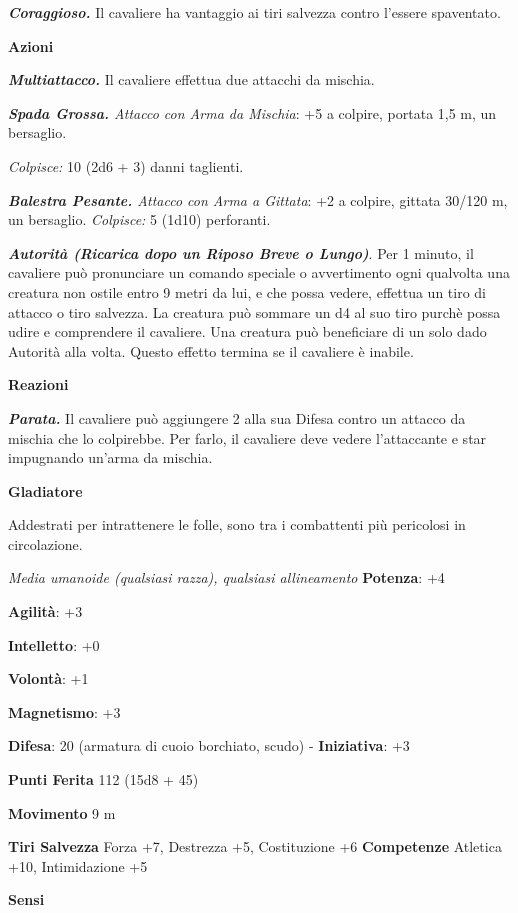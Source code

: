 \begin{multicols}{2}
\emph{\textbf{Coraggioso.}} Il cavaliere ha vantaggio ai tiri salvezza
contro l'essere spaventato.

\textbf{Azioni}

\emph{\textbf{Multiattacco.}} Il cavaliere effettua due attacchi da
mischia.

\emph{\textbf{Spada Grossa.} Attacco con Arma da Mischia}: +5 a colpire,
portata 1,5 m, un bersaglio.

\emph{Colpisce:} 10 (2d6 + 3) danni taglienti.

\emph{\textbf{Balestra Pesante.} Attacco con Arma a Gittata}: +2 a
colpire, gittata 30/120 m, un bersaglio. \emph{Colpisce:} 5 (1d10)
perforanti.

\emph{\textbf{Autorità (Ricarica dopo un Riposo Breve o Lungo)}}. Per 1
minuto, il cavaliere può pronunciare un comando speciale o avvertimento
ogni qualvolta una creatura non ostile entro 9 metri da lui, e che possa
vedere, effettua un tiro di attacco o tiro salvezza. La creatura può
sommare un d4 al suo tiro purchè possa udire e comprendere il cavaliere.
Una creatura può beneficiare di un solo dado Autorità alla volta. Questo
effetto termina se il cavaliere è inabile.

\textbf{Reazioni}

\emph{\textbf{Parata.}} Il cavaliere può aggiungere 2 alla sua Difesa contro
un attacco da mischia che lo colpirebbe. Per farlo, il cavaliere deve
vedere l'attaccante e star impugnando un'arma da mischia.



\textbf{Gladiatore}

Addestrati per intrattenere le folle, sono tra i combattenti più
pericolosi in circolazione.

\emph{Media umanoide (qualsiasi razza), qualsiasi allineamento}
\textbf{Potenza}: +4

\textbf{Agilità}: +3

\textbf{Intelletto}: +0

\textbf{Volontà}: +1

\textbf{Magnetismo}: +3

\textbf{Difesa}: 20 (armatura di cuoio borchiato, scudo) - \textbf{Iniziativa}: +3

\textbf{Punti Ferita} 112 (15d8 + 45)

\textbf{Movimento} 9 m

\textbf{Tiri Salvezza} Forza +7, Destrezza +5, Costituzione +6
\textbf{Competenze} Atletica +10, Intimidazione +5

\textbf{Sensi} 


\end{multicols}
